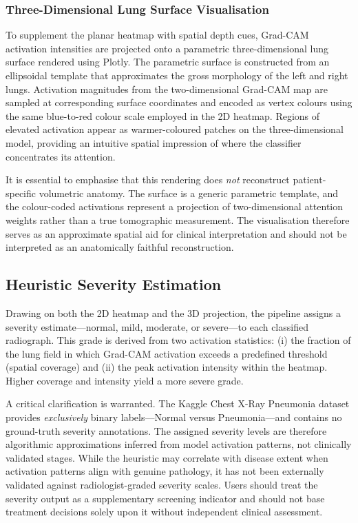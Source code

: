 \documentclass[conference]{IEEEtran}
\begin{document}
\subsubsection{Three-Dimensional Lung Surface Visualisation}

To supplement the planar heatmap with spatial depth cues, Grad-CAM activation intensities are projected onto a parametric three-dimensional lung surface rendered using Plotly. The parametric surface is constructed from an ellipsoidal template that approximates the gross morphology of the left and right lungs. Activation magnitudes from the two-dimensional Grad-CAM map are sampled at corresponding surface coordinates and encoded as vertex colours using the same blue-to-red colour scale employed in the 2D heatmap. Regions of elevated activation appear as warmer-coloured patches on the three-dimensional model, providing an intuitive spatial impression of where the classifier concentrates its attention.

It is essential to emphasise that this rendering does \emph{not} reconstruct patient-specific volumetric anatomy. The surface is a generic parametric template, and the colour-coded activations represent a projection of two-dimensional attention weights rather than a true tomographic measurement. The visualisation therefore serves as an approximate spatial aid for clinical interpretation and should not be interpreted as an anatomically faithful reconstruction.

\subsection{Heuristic Severity Estimation}
Drawing on both the 2D heatmap and the 3D projection, the pipeline assigns a severity estimate---normal, mild, moderate, or severe---to each classified radiograph. This grade is derived from two activation statistics: (i) the fraction of the lung field in which Grad-CAM activation exceeds a predefined threshold (spatial coverage) and (ii) the peak activation intensity within the heatmap. Higher coverage and intensity yield a more severe grade.

A critical clarification is warranted. The Kaggle Chest X-Ray Pneumonia dataset provides \emph{exclusively} binary labels---Normal versus Pneumonia---and contains no ground-truth severity annotations. The assigned severity levels are therefore algorithmic approximations inferred from model activation patterns, not clinically validated stages. While the heuristic may correlate with disease extent when activation patterns align with genuine pathology, it has not been externally validated against radiologist-graded severity scales. Users should treat the severity output as a supplementary screening indicator and should not base treatment decisions solely upon it without independent clinical assessment.
\end{document}
